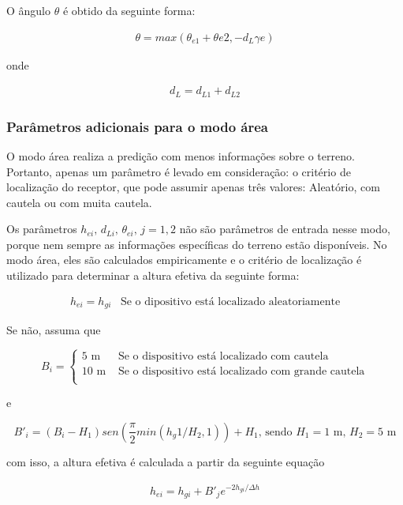 O ângulo $\theta$ é obtido da seguinte forma:

\begin{align}
\label{theta} \theta = max(\theta_{e1} + \theta{e2}, -d_{L} \gamma e)
\end{align}

onde

\begin{align}
\label{dl} d_L = d_{L1} + d_{L2}
\end{align}

\subsubsection{Parâmetros adicionais para o modo área}

O modo área realiza a predição com menos informações sobre o terreno. Portanto, apenas um parâmetro é levado em consideração: o critério de localização do receptor, que pode assumir apenas três valores: Aleatório, com cautela ou com muita cautela.

Os parâmetros \begin{math}h_{ei}, \, d_{Li}, \, \theta_{ei}, \, j=1,2\end{math} não são parâmetros de entrada nesse modo, porque nem sempre as informações específicas do terreno estão disponíveis. No modo área, eles são calculados empiricamente e o critério de localização é utilizado para determinar a altura efetiva da seguinte forma:

\begin{align}
\label{h_ei} h_{ei} = h_{gi} \,\,\,\,\, \text{Se o dipositivo está localizado aleatoriamente}
\end{align}

Se não, assuma que

\[ B_i = \begin{cases} 
      5 \text{ m} & \textrm{ Se o dispositivo está localizado com cautela} \\
      10 \text{ m} & \textrm{ Se o dispositivo está localizado com grande cautela} \\
   \end{cases} \]  
   
e

\[ B'_i = (B_i - H_1)sen(\frac{\pi}{2} min(h_g1/H_2,1)) + H_1 \textrm{, sendo $H_1 = 1$ m, $H_2 = 5$ m} \]

com isso, a altura efetiva é calculada a partir da seguinte equação

\begin{align} 
\label{hei} h_{ei} = h_{gi} + B'_je^{-2h_{gi}/\Delta h}
\end{align}

